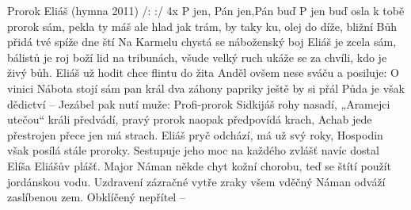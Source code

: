\begin{TEXT}{Prorok Eliáš (hymna 2011)}
\REFREN  /:  :/                      4x \NL
  P jen, Pán jen,Pán buď  \NL             %
P jen  buď osla
\SLOKA {} k tobě prorok sám,  pekla \NL
	ty máš ale hlad jak trám,  by taky \NL
	ku, olej  do díže,  bližní\NL
	 Bůh přidá  tvé spíže  dne ští
\SLOKA Na Karmelu chystá se náboženský boj\NL
	Eliáš je zcela sám, bálistů je roj\NL
	boží lid na tribunách, všude velký ruch\NL
	ukáže se za chvíli, kdo je živý bůh.
\SLOKA Eliáš už hodit chce flintu do žita\NL
	\NL
	Anděl ovšem nese sváču a posiluje:\NL
\SLOKA O vinici Nábota stojí sám pan král\NL
	dva záhony papriky ještě by si přál\NL
	Půda je však dědictví -- \NL
	Jezábel pak nutí muže: 
\SLOKA Profi-prorok Sidkijáš rohy nasadí, \NL
	„Aramejci utečou“ králi předvádí, \NL
	pravý prorok naopak předpovídá krach, \NL
	Achab jede přestrojen přece jen má strach.\pagebreak
\SLOKA Eliáš pryč odchází, má už svý roky,\NL
	Hospodin však posílá stále proroky.\NL
	Sestupuje jeho moc na každého zvlášť\NL
	navíc dostal Elíša Eliášův plášť.
\SLOKA Major Náman někde chyt kožní chorobu, \NL
	teď se štítí použít jordánskou vodu. \NL
	Uzdravení zázračné vytře zraky všem \NL
	vděčný Náman odváží zaslíbenou zem.
\SLOKA Obklíčený nepřítel -- \NL
\REFRENHRAJ
\end{TEXT}
